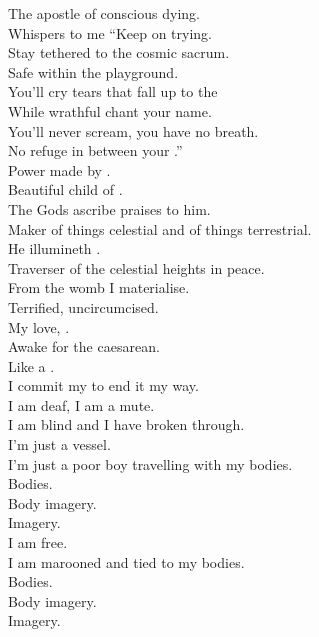 

The apostle of conscious dying. \\
Whispers to me ``Keep on trying. \\
Stay tethered to the cosmic sacrum. \\
Safe within the  playground. \\
You'll cry tears that fall up to the  \\
While wrathful  chant your name. \\
You'll never scream, you have no breath. \\
No refuge in between your .'' \\

Power made by . \\
Beautiful child of . \\
The Gods ascribe praises to him. \\
Maker of things celestial and of things terrestrial. \\
He illumineth . \\
Traverser of the celestial heights in peace. \\

From the womb I materialise. \\
Terrified, uncircumcised. \\
My  love, . \\
Awake for the caesarean. \\
Like a . \\
I commit my  to end it my way. \\
I am deaf, I am a mute. \\
I am blind and I have broken through. \\

I'm just a vessel. \\
I'm just a poor boy travelling with my bodies. \\
Bodies. \\
Body imagery. \\
Imagery. \\
I am free. \\
I am marooned and tied to my bodies. \\
Bodies. \\
Body imagery. \\
Imagery. \\

